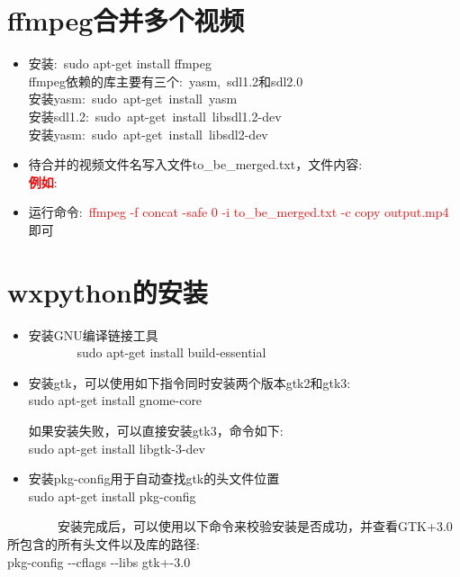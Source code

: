 \documentclass{article}      %
\begin{document}
\section{\rm{ffmpeg}合并多个视频}
\begin{itemize}
	\item 安装:~\textrm{sudo apt-get install ffmpeg}\\
		\textrm{ffmpeg}依赖的库主要有三个:~\textrm{yasm},~\textrm{sdl1.2}和\textrm{sdl2.0}\\
		安装\textrm{yasm}:~\textrm{sudo~apt-get~install~yasm}\\
		安装\textrm{sdl1.2}:~\textrm{sudo~apt-get~install~libsdl1.2-dev}\\
		安装\textrm{yasm}:~\textrm{sudo~apt-get~install~libsdl2-dev}
	\item 待合并的视频文件名写入文件\textrm{to\_be\_merged.txt}，文件内容:\\
		\textcolor{red}{\textbf{例如}}: %
	\item 运行命令:~\textcolor{red}{\textrm{ffmpeg -f concat -safe 0 -i to\_be\_merged.txt -c copy output.mp4}}即可
\end{itemize}

\section{\rm{wxpython}的安装}
\begin{itemize}
	\item 安装\textrm{GNU}编译链接工具\\ 
		        \textrm{sudo apt-get install build-essential}

	\item 安装\textrm{gtk}，可以使用如下指令同时安装两个版本\textrm{gtk2}和\textrm{gtk3}:\\
		\textrm{sudo apt-get install gnome-core}

		如果安装失败，可以直接安装\textrm{gtk3}，命令如下:\\
		\textrm{sudo apt-get install libgtk-3-dev}

	\item 安装\textrm{pkg-config}用于自动查找\textrm{gtk}的头文件位置\\
		\textrm{sudo apt-get install pkg-config}
\end{itemize}
        安装完成后，可以使用以下命令来校验安装是否成功，并查看\textrm{GTK+3.0}所包含的所有头文件以及库的路径:\\
\textrm{pkg-config -\/-cflags -\/-libs gtk+-3.0}
\end{document}
